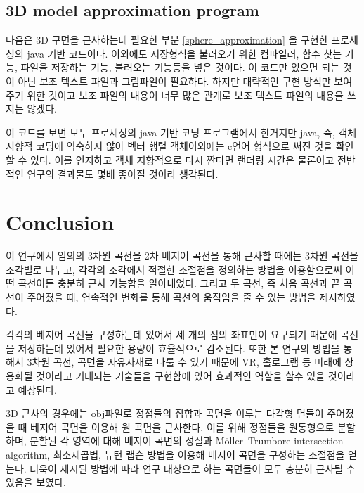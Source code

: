 \documentclass{gshs_thesis}
\theoremstyle{theorem}
\theoremstyle{lemma}
\theoremstyle{definition}
\begin{document}
\subsection{3D model approximation program} \label{3D model approximation program}
다음은 3D 구면을 근사하는데 필요한 부분 \cref{sphere_approximation} 을 구현한 프로세싱의 java 기반 코드이다. 이외에도 저장형식을 불러오기 위한 컴파일러, 함수 찾는 기능, 파일을 저장하는 기능, 불러오는 기능등을 넣은 것이다. 이 코드만 있으면 되는 것이 아닌 보조 텍스트 파일과 그림파일이 필요하다. 하지만 대략적인 구현 방식만 보여주기 위한 것이고 보조 파일의 내용이 너무 많은 관계로 보조 텍스트 파일의 내용을 쓰지는 않겠다. 

이 코드를 보면 모두 프로세싱의 java 기반 코딩 프로그램에서 한거지만 java, 즉, 객체 지향적 코딩에 익숙하지 않아 벡터 행렬 객체이외에는 c언어 형식으로 써진 것을 확인 할 수 있다. 이를 인지하고 객체 지향적으로 다시 짠다면 랜더링 시간은 물론이고 전반적인 연구의 결과물도 몇배 좋아질 것이라 생각된다.
\clearpage
\begin{multicols}{2}
	
\end{multicols}
\section{Conclusion}
이 연구에서 임의의 3차원 곡선을 2차 베지어 곡선을 통해 근사할 때에는 3차원 곡선을 조각별로 나누고, 각각의 조각에서 적절한 조절점을 정의하는 방법을 이용함으로써 어떤 곡선이든 충분히 근사 가능함을 알아내었다. 그리고 두 곡선, 즉 처음 곡선과 끝 곡선이 주어졌을 때, 연속적인 변화를 통해 곡선의 움직임을 줄 수 있는 방법을 제시하였다. 

각각의 베지어 곡선을 구성하는데 있어서 세 개의 점의 좌표만이 요구되기 때문에 곡선을 저장하는데 있어서 필요한 용량이 효율적으로 감소된다. 또한 본 연구의 방법을 통해서 3차원 곡선, 곡면을 자유자재로 다룰 수 있기 때문에 VR, 홀로그램 등 미래에 상용화될 것이라고 기대되는 기술들을 구현함에 있어 효과적인 역할을 할수 있을 것이라고 예상된다. 

3D 근사의 경우에는 obj파일로 정점들의 집합과 곡면을 이루는 다각형 면들이 주어졌을 때 베지어 곡면을 이용해 원 곡면을 근사한다. 이를 위해 정점들을 원통형으로 분할하며, 분할된 각 영역에 대해 베지어 곡면의 성질과 Möller–Trumbore intersection algorithm, 최소제곱법, 뉴턴-랩슨 방법을 이용해 베지어 곡면을 구성하는 조절점을 얻는다. 더욱이 제시된 방법에 따라 연구 대상으로 하는 곡면들이 모두 충분히 근사될 수 있음을 보였다. 
\end{document}
